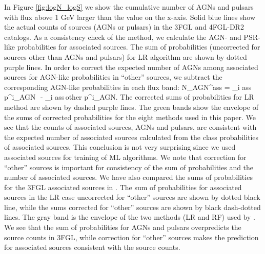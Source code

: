 In Figure \ref{fig:logN_logS} we show the cumulative number of AGNs and pulsars with flux above 1 GeV larger than the
value on the x-axis.
Solid blue lines show the actual counts of sources (AGNs or pulsars) in the 3FGL and 4FGL-DR2 catalogs.
As a consistency check of the method, we calculate the AGN- and PSR-like probabilities for associated sources.
The sum of probabilities (uncorrected for sources other than AGNs and pulsars) for LR algorithm are shown by dotted purple lines.
In order to correct the expected number of AGNs among associated sources for AGN-like probabilities in ``other'' sources, 
we subtract the corresponding AGN-like probabilities in each flux band:
\be
{}
N_{\rm AGN}^{\rm ass}  = \sum_{i \in \rm ass} p^i_{\rm AGN}\,\, - \sum_{i \in \rm ass\,other} p^i_{\rm AGN}.
\ee
The corrected sums of probabilities for LR method are shown by dashed purple lines.
The green bands show the envelope of the sums of corrected probabilities for the eight methods used in this paper.
We see that the counts of associated sources, AGNs and pulsars, are consistent with the expected number of associated sources
calculated from the class probabilities of associated sources.
This conclusion is not very surprising since we used associated sources for training of ML algorithms.
We note that correction for ``other'' sources is important for consistency of the sum of probabilities and the number of associated sources.
We have also compared the sums of probabilities for the 3FGL associated sources in \cite{2016ApJ...820....8S}.
The sum of probabilities for associated sources in the LR case uncorrected for ``other'' sources are shown by dotted black line,
while the sums corrected for ``other'' sources are shown by black dash-dotted lines.
The gray band is the envelope of the two methods (LR and RF) used by \cite{2016ApJ...820....8S}.
We see that the sum of probabilities for AGNs and pulsars overpredicts the source counts in 3FGL, 
while correction for ``other'' sources makes the prediction for associated sources consistent with the source counts.

